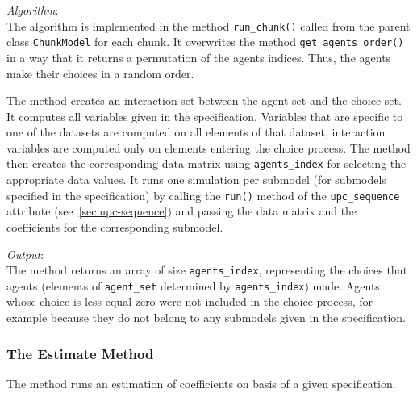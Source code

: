 {{\it Algorithm}:~\\[1mm]
The algorithm is implemented in the method \verb|run_chunk()| called from the
parent class \verb|ChunkModel| for each chunk. It overwrites the
 method \verb|get_agents_order()| in a way that it returns a
permutation of the agents indices. Thus, the agents make their choices in a
random order.

The method creates an interaction set between the agent set and the choice
set. It computes all variables \variablesindex given in the specification. Variables \variablesindex that are
specific to one of the datasets \datasetindex are computed on all elements of that dataset, \datasetindex
interaction variables \variablesindex are computed only on elements entering the choice
process. The method then creates the corresponding data matrix using
\verb|agents_index| for selecting the appropriate data values. It runs one
simulation per submodel (for submodels specified in the specification) by
calling the \verb|run()| method of the \verb|upc_sequence| attribute \attributesindex
(see~\ref{sec:upc-sequence}) and passing the data matrix and the coefficients \coefficientsindex
for the corresponding submodel.

{\it Output}:~\\[1mm]
The method returns an array of size \verb|agents_index|, representing the
choices that agents (elements of \verb|agent_set| determined by
\verb|agents_index|) made. Agents whose choice is less equal zero  were
not included in the choice process, for example because they do not belong to
any submodels given in the specification.

\subsubsection{The Estimate Method}
%
The  method runs an estimation of coefficients \coefficientsindex on basis of
a given specification.

}
